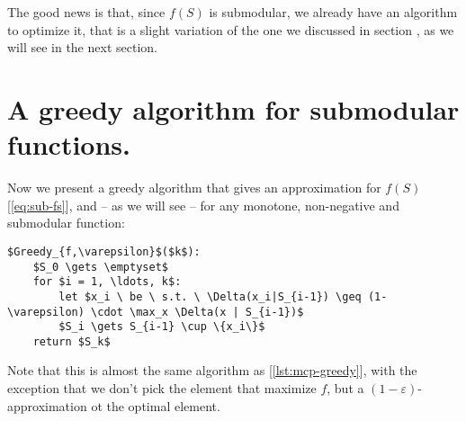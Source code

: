 The good news is that, since $f(S)$ is submodular, we already have an algorithm to optimize it, that is a slight variation of the one we discussed in section , as we will see in the next section.


\section{A greedy algorithm for submodular functions.} \label{sec:submodular-greedy}

Now we present a greedy algorithm that gives an approximation for $f(S)$ [\ref{eq:sub-fs}], and -- as we will see -- for any monotone, non-negative and submodular function:
\begin{lstlisting}[caption={Greedy algorithm},label={lst:fS-greedy}]
$Greedy_{f,\varepsilon}$($k$):
    $S_0 \gets \emptyset$
    for $i = 1, \ldots, k$:
        let $x_i \ be \ s.t. \ \Delta(x_i|S_{i-1}) \geq (1- \varepsilon) \cdot \max_x \Delta(x | S_{i-1})$
        $S_i \gets S_{i-1} \cup \{x_i\}$
    return $S_k$
\end{lstlisting}
Note that this is almost the same algorithm as [\ref{lst:mcp-greedy}], with the exception that we don't pick the element that maximize $f$, but a $(1-\varepsilon)$-approximation ot the optimal element.

